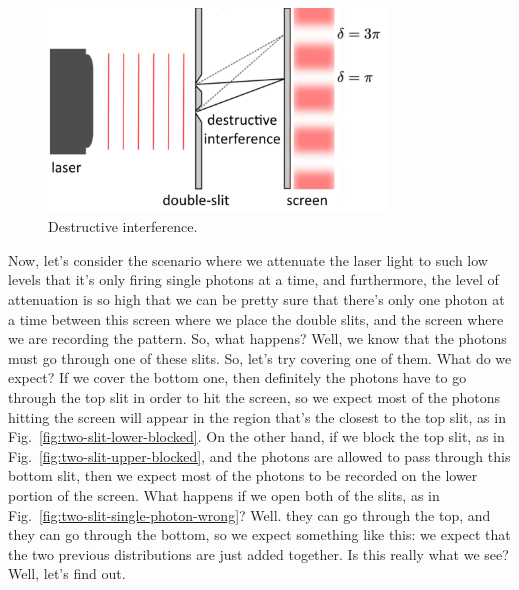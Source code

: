 \begin{figure}[H]
   \centering
    \includegraphics[width=0.8\textwidth]{lesson6/double_slit_destructive.pdf}
        \caption{Destructive interference.}
    \label{fig:two-slit-destructive}    
\end{figure}

Now, let's consider the scenario where we attenuate the laser light to such low levels that it's only firing single photons at a time, and furthermore, the level of attenuation is so high that we can be pretty sure that there's only one photon at a time between this screen where we place the double slits, and the screen where we are recording the pattern. So, what happens? Well, we know that the photons must go through one of these slits. So, let's try covering one of them. What do we expect? If we cover the bottom one, then definitely the photons have to go through the top slit in order to hit the screen, so we expect most of the photons hitting the screen will appear in the region that's the closest to the top slit, as in Fig.~\ref{fig:two-slit-lower-blocked}. On the other hand, if we block the top slit, as in Fig.~\ref{fig:two-slit-upper-blocked}, and the photons are allowed to pass through this bottom slit, then we expect most of the photons to be recorded on the lower portion of the screen. What happens if we open both of the slits, as in Fig.~\ref{fig:two-slit-single-photon-wrong}? Well. they can go through the top, and they can go through the bottom, so we expect something like this: we expect that the two previous distributions are just added together. Is this really what we see? Well, let's find out. 

